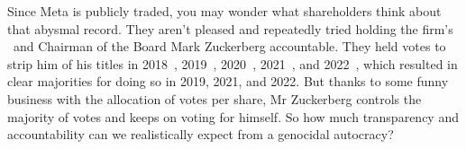 Since Meta is publicly traded, you may wonder what shareholders think about that
abysmal record. They aren't pleased and repeatedly tried holding the firm's
\CEO\ and Chairman of the Board Mark Zuckerberg accountable. They held votes to
strip him of his titles in 2018~\cite{Butler2018}, 2019~\cite{Sumagaysay2019},
2020~\cite{McRitchie2020}, 2021~\cite{Nix2021}, and 2022~\cite{WatersAgnew2022},
which resulted in clear majorities for doing so in 2019, 2021, and 2022. But
thanks to some funny business with the allocation of votes per share, Mr
Zuckerberg controls the majority of votes and keeps on voting for himself. So
how much transparency and accountability can we realistically expect from a
genocidal autocracy?
